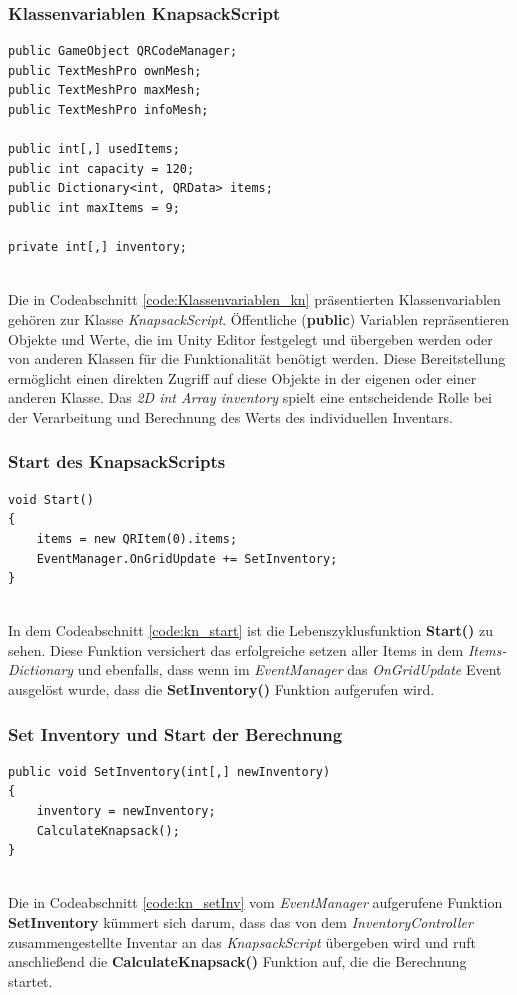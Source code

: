 \subsubsection{Klassenvariablen KnapsackScript}
\begin{lstlisting}[style=csharp, caption={Klassenvariablen des KnapsackSolvers}, label=code:Klassenvariablen_kn]
public GameObject QRCodeManager;
public TextMeshPro ownMesh;
public TextMeshPro maxMesh;
public TextMeshPro infoMesh;

public int[,] usedItems;
public int capacity = 120;
public Dictionary<int, QRData> items;
public int maxItems = 9;

private int[,] inventory;
\end{lstlisting}\\
Die in Codeabschnitt \ref{code:Klassenvariablen_kn} präsentierten Klassenvariablen gehören zur Klasse \textit{KnapsackScript}.
Öffentliche (\textbf{public}) Variablen repräsentieren Objekte und Werte, die im Unity Editor festgelegt und übergeben
werden oder von anderen Klassen für die Funktionalität benötigt werden. Diese Bereitstellung ermöglicht einen direkten
Zugriff auf diese Objekte in der eigenen oder einer anderen Klasse. Das \textit{2D int Array inventory} spielt eine
entscheidende Rolle bei der Verarbeitung und Berechnung des Werts des individuellen Inventars.\\

\subsubsection{Start des KnapsackScripts}
\begin{lstlisting}[style=csharp, caption={Start Funktion des KnapsackScripts}, label=code:kn_start]
void Start()
{
    items = new QRItem(0).items;
    EventManager.OnGridUpdate += SetInventory;
}
\end{lstlisting}\\
In dem Codeabschnitt \ref{code:kn_start} ist die Lebenszyklusfunktion \textbf{Start()} zu sehen. Diese Funktion versichert
das erfolgreiche setzen aller Items in dem \textit{Items-Dictionary} und ebenfalls, dass wenn im \textit{EventManager}
das \textit{OnGridUpdate} Event ausgelöst wurde, dass die \textbf{SetInventory()} Funktion aufgerufen wird.

\subsubsection{Set Inventory und Start der Berechnung}
\begin{lstlisting}[style=csharp, caption={Setzen des Inventars und starten der Berechnung}, label=code:kn_setInv]
public void SetInventory(int[,] newInventory)
{
    inventory = newInventory;
    CalculateKnapsack();
}
\end{lstlisting}\\
Die in Codeabschnitt \ref{code:kn_setInv} vom \textit{EventManager} aufgerufene Funktion \textbf{SetInventory}
kümmert sich darum, dass das von dem \textit{InventoryController} zusammengestellte Inventar an das \textit{KnapsackScript}
übergeben wird und ruft anschließend die \textbf{CalculateKnapsack()} Funktion auf, die die Berechnung startet.

